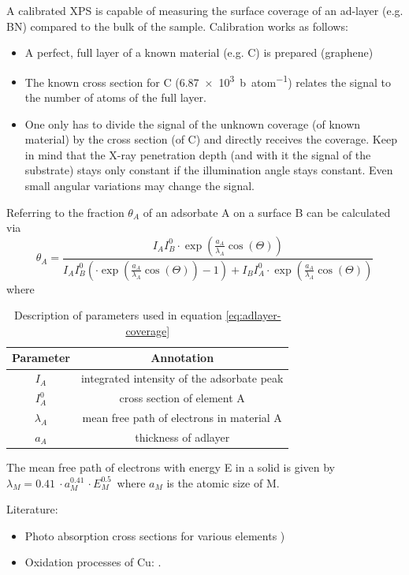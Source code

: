 A calibrated XPS is capable of measuring the surface coverage of an ad-layer (e.g. BN) compared to the bulk of the sample. Calibration works as follows:
\begin{itemize}
 \item A perfect, full layer of a known material (e.g. C) is prepared (graphene)
 \item The known cross section for C (\SI{6,87e3}{\barn\per atom})\cite{henke_x-ray_1993} relates the signal to the number of atoms of the full layer.
 \item One only has to divide the signal of the unknown coverage (of known material) by the cross section (of C) and directly receives the coverage. Keep in mind that the X-ray penetration depth (and with it the signal of the substrate) stays only constant if the illumination angle stays constant. Even small angular variations may change the signal.
\end{itemize}
Referring to \cite{ertl_low_1986} the fraction $\theta_A$ of an adsorbate A on a surface B can be calculated via
\begin{equation}\label{eq:adlayer-coverage}
 \theta_A=\frac{I_AI_B^0\cdot \exp(\frac{a_A}{\lambda_A}\cos(\Theta))}{I_AI_B^0(\cdot \exp(\frac{a_A}{\lambda_A}\cos(\Theta))-1)+I_BI_A^0\cdot \exp(\frac{a_A}{\lambda_A}\cos(\Theta))}
\end{equation}
where 
\begin{table}[h!]\centering
\caption{Description of parameters used in equation \ref{eq:adlayer-coverage}}
 \begin{tabular}{cc}
  Parameter & Annotation \\ \hline \hline
  $I_A$	& integrated intensity of the adsorbate peak \\
  $I_A^0$ & cross section of element A \\
  $\lambda_A$ & mean free path of electrons in material A \\
  $a_A$ & thickness of adlayer \\
 \end{tabular}
\end{table}
The mean free path of electrons with energy E in a solid is given by $\lambda_M=\SI{0,41}{}\cdot a_M^{\SI{0,41}{}}\cdot E_M^{\SI{0,5}{}} $ where $a_M$ is the atomic size of M. 

Literature:
\begin{itemize}
 \item Photo absorption cross sections for various elements \cite{henke_x-ray_1993})
 \item Oxidation processes of Cu: \cite{deroubaix_x-ray_1992}.
\end{itemize}